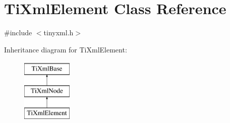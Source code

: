 \hypertarget{classTiXmlElement}{\section{\-Ti\-Xml\-Element \-Class \-Reference}
\label{classTiXmlElement}
}


{\ttfamily \#include $<$tinyxml.\-h$>$}

\-Inheritance diagram for \-Ti\-Xml\-Element\-:\begin{figure}[H]
\begin{center}
\leavevmode
\includegraphics[height=3.000000cm]{classTiXmlElement}
\end{center}
\end{figure}
